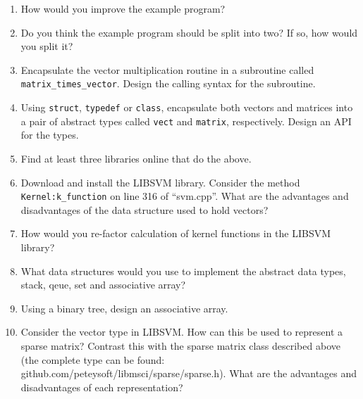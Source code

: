 \documentclass{article}
\begin{document}
\begin{enumerate}
  \item How would you improve the example program?
  \item Do you think the example program should be split into two? If so, how would you split it?
  \item Encapsulate the vector multiplication routine in a subroutine called \verb/matrix_times_vector/. Design the calling syntax for the subroutine.
  \item Using \verb/struct/, \verb/typedef/ or \verb/class/, encapsulate both vectors and matrices into a pair of abstract types called \verb/vect/ and \verb/matrix/, respectively. Design an API for the types.
  \item Find at least three libraries online that do the above.
  \item Download and install the LIBSVM library. Consider the method 
	  \verb/Kernel:k_function/ on line 316 of ``svm.cpp''. What are the
	  advantages and disadvantages of the data structure used to hold 
	  vectors?
  \item How would you re-factor calculation of kernel functions in the LIBSVM library?
  \item What data structures would you use to implement the abstract data types, stack, qeue, set and associative array?
  \item Using a binary tree, design an associative array.
  \item Consider the vector type in LIBSVM. How can this be used to represent a sparse matrix? Contrast this with the sparse matrix class described above (the complete type can be found: github.com/peteysoft/libmsci/sparse/sparse.h). What are the advantages and disadvantages of each representation?
\end{enumerate}
\end{document}
